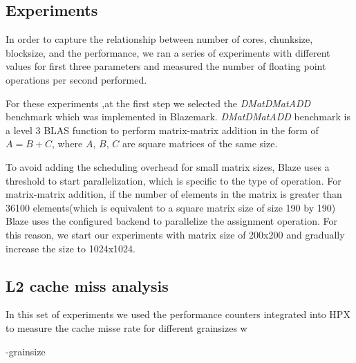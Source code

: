 \subsection{Experiments}
In order to capture the relationship between number of cores, chunk\textunderscore size, block\textunderscore size, and the performance, we ran a series of experiments with different values for first three parameters and measured the number of floating point operations per second performed. 

For these experiments ,at the first step we selected the \textit{DMatDMatADD} benchmark which was implemented in Blazemark. \textit{DMatDMatADD} benchmark is a level 3 BLAS function to perform matrix-matrix addition in the form of $A=B+C$, where $A$, $B$, $C$ are square matrices of the same size. 

To avoid adding the scheduling overhead for small matrix sizes, Blaze uses a threshold to start parallelization, which is specific to the type of operation. For matrix-matrix addition, if the number of elements in the matrix is greater than 36100 elements(which is equivalent to a square matrix size of size 190 by 190) Blaze uses the configured backend to parallelize the assignment operation. For this reason, we start our experiments with matrix size of 200x200 and gradually increase the size to 1024x1024. 

  

\subsection{L2 cache miss analysis}
In this set of experiments we used the performance counters integrated into HPX to measure the cache misse rate for different grain\textunderscore sizes w

-grain\textunderscore size
